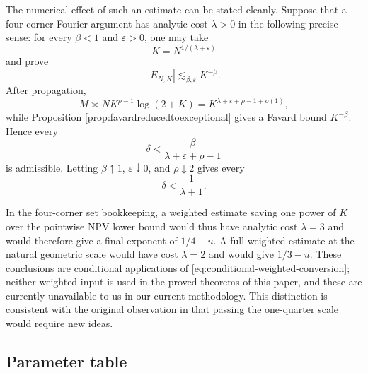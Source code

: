 \documentclass[12pt]{amsart}
\numberwithin{equation}{section}
\begin{document}
The numerical effect of such an estimate can be stated cleanly.  Suppose that
a four-corner Fourier argument has analytic cost $\lambda>0$ in the following
precise sense: for every $\beta<1$ and $\varepsilon>0$, one may take
\[
 K=N^{1/(\lambda+\varepsilon)}
\]
and prove
\[
 |E_{N,K}|\lesssim_{\beta,\varepsilon}K^{-\beta}.
\]
After propagation,
\[
 M\asymp NK^{\rho-1}\log(2+K)
 =K^{\lambda+\varepsilon+\rho-1+o(1)},
\]
while Proposition \ref{prop:favardreducedtoexceptional} gives a Favard bound
$K^{-\beta}$.  Hence every
\begin{equation}\label{eq:conditional-weighted-conversion}
 \delta<\frac{\beta}{\lambda+\varepsilon+\rho-1}
\end{equation}
is admissible.  Letting $\beta\uparrow1$, $\varepsilon\downarrow0$, and
$\rho\downarrow2$ gives every
\[
 \delta<\frac1{\lambda+1}.
\]

In the four-corner set bookkeeping, a weighted estimate saving one power of $K$
over the pointwise NPV lower bound would thus have analytic cost $\lambda=3$ and
would therefore give a final exponent of $1/4-u$.  A full weighted estimate at the natural geometric scale would have cost $\lambda=2$ and would give $1/3-u$.  These
conclusions are conditional applications of
\eqref{eq:conditional-weighted-conversion}; neither weighted input is used in
the proved theorems of this paper, and these are currently unavailable to us in our current methodology.  This distinction is consistent with the
original observation in \cite[p. 3]{NPV} that passing the one-quarter scale
would require new ideas.


\clearpage
\subsection{Parameter table}\label{subsec:parametertable}
\end{document}
